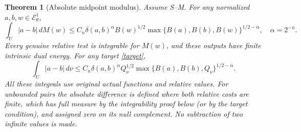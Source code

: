 \documentclass[10pt]{article}
\newtheorem{theorem}{Theorem}[section]
\newcommand{\E}{\mathcal E}
\begin{document}
\begin{theorem}[Absolute midpoint modulus]\label{absolute-original}
Assume S--M. For any normalized $a,b,w\in\E^1_\theta$,
\begin{equation}\label{modulus-output}
 \int_U|a-b|\,dM(w)
 \leq C_n\delta(a,b)^\alpha B(w)^{1/2}
           \max\{B(a),B(b),B(w)\}^{1/2-\alpha},\quad \alpha=2^{-n}.
\end{equation}
Every genuine relative test is integrable for $M(w)$, and these outputs
have finite intrinsic dual energy. For any target \eqref{target},
\begin{equation}\label{modulus-target}
 \int_U|a-b|\,d\nu
 \leq C_n\delta(a,b)^\alpha Q_\nu^{1/2}
          \max\{B(a),B(b),Q_\nu\}^{1/2-\alpha}.
\end{equation}
All these integrals use original actual functions and relative values.
For unbounded pairs the absolute difference is defined where both relative
costs are finite, which has full measure by the integrability proof below
(or by the target condition), and assigned zero on its null complement.
No subtraction of two infinite values is made.
\end{theorem}
\end{document}
